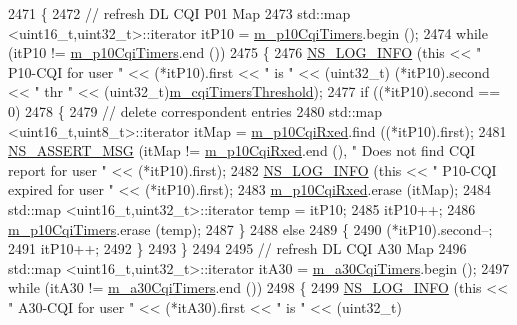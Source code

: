 \begin{DoxyCode}
2471 \{
2472   \textcolor{comment}{// refresh DL CQI P01 Map}
2473   std::map <uint16\_t,uint32\_t>::iterator itP10 = \hyperlink{classns3_1_1CqaFfMacScheduler_a3ca7ca5692a1cc661ac68052dc595948}{m\_p10CqiTimers}.begin ();
2474   \textcolor{keywordflow}{while} (itP10 != \hyperlink{classns3_1_1CqaFfMacScheduler_a3ca7ca5692a1cc661ac68052dc595948}{m\_p10CqiTimers}.end ())
2475     \{
2476       \hyperlink{group__logging_gafbd73ee2cf9f26b319f49086d8e860fb}{NS\_LOG\_INFO} (\textcolor{keyword}{this} << \textcolor{stringliteral}{" P10-CQI for user "} << (*itP10).first << \textcolor{stringliteral}{" is "} << (uint32\_t)
      (*itP10).second << \textcolor{stringliteral}{" thr "} << (uint32\_t)\hyperlink{classns3_1_1CqaFfMacScheduler_ab2ea609b39ce10062f2bdd8027dd6edd}{m\_cqiTimersThreshold});
2477       \textcolor{keywordflow}{if} ((*itP10).second == 0)
2478         \{
2479           \textcolor{comment}{// delete correspondent entries}
2480           std::map <uint16\_t,uint8\_t>::iterator itMap = \hyperlink{classns3_1_1CqaFfMacScheduler_a05d86455f13e9c54ef7b7be87d74bf62}{m\_p10CqiRxed}.find ((*itP10).first);
2481           \hyperlink{assert_8h_aff5ece9066c74e681e74999856f08539}{NS\_ASSERT\_MSG} (itMap != \hyperlink{classns3_1_1CqaFfMacScheduler_a05d86455f13e9c54ef7b7be87d74bf62}{m\_p10CqiRxed}.end (), \textcolor{stringliteral}{" Does not find CQI report
       for user "} << (*itP10).first);
2482           \hyperlink{group__logging_gafbd73ee2cf9f26b319f49086d8e860fb}{NS\_LOG\_INFO} (\textcolor{keyword}{this} << \textcolor{stringliteral}{" P10-CQI expired for user "} << (*itP10).first);
2483           \hyperlink{classns3_1_1CqaFfMacScheduler_a05d86455f13e9c54ef7b7be87d74bf62}{m\_p10CqiRxed}.erase (itMap);
2484           std::map <uint16\_t,uint32\_t>::iterator temp = itP10;
2485           itP10++;
2486           \hyperlink{classns3_1_1CqaFfMacScheduler_a3ca7ca5692a1cc661ac68052dc595948}{m\_p10CqiTimers}.erase (temp);
2487         \}
2488       \textcolor{keywordflow}{else}
2489         \{
2490           (*itP10).second--;
2491           itP10++;
2492         \}
2493     \}
2494 
2495   \textcolor{comment}{// refresh DL CQI A30 Map}
2496   std::map <uint16\_t,uint32\_t>::iterator itA30 = \hyperlink{classns3_1_1CqaFfMacScheduler_ab6b356ca3bc799a5a1a51b7c687d87e4}{m\_a30CqiTimers}.begin ();
2497   \textcolor{keywordflow}{while} (itA30 != \hyperlink{classns3_1_1CqaFfMacScheduler_ab6b356ca3bc799a5a1a51b7c687d87e4}{m\_a30CqiTimers}.end ())
2498     \{
2499       \hyperlink{group__logging_gafbd73ee2cf9f26b319f49086d8e860fb}{NS\_LOG\_INFO} (\textcolor{keyword}{this} << \textcolor{stringliteral}{" A30-CQI for user "} << (*itA30).first << \textcolor{stringliteral}{" is "} << (uint32\_t)

\end{DoxyCode}
